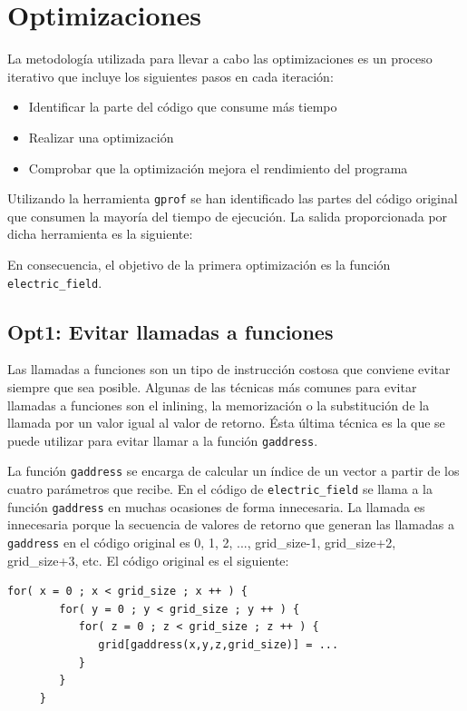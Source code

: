 \section{Optimizaciones}

La metodolog\'{i}a utilizada para llevar a cabo las optimizaciones es un
proceso iterativo que incluye los siguientes pasos en cada iteraci\'{o}n:

\begin{itemize}
\item Identificar la parte del c\'{o}digo que consume m\'{a}s tiempo
\item Realizar una optimizaci\'{o}n
\item Comprobar que la optimizaci\'{o}n mejora el rendimiento del programa
\end{itemize}

Utilizando la herramienta \texttt{gprof} se han identificado las partes del
c\'{o}digo original que consumen la mayor\'{i}a del tiempo de ejecuci\'{o}n.
La salida proporcionada por dicha herramienta es la siguiente:


En consecuencia, el objetivo de la primera optimizaci\'{o}n es la funci\'{o}n
\texttt{electric\_field}.

\subsection{Opt1: Evitar llamadas a funciones}

Las llamadas a funciones son un tipo de instrucci\'{o}n costosa que conviene
evitar siempre que sea posible. Algunas de las t\'{e}cnicas m\'{a}s comunes
para evitar llamadas a funciones son el inlining, la memorizaci\'{o}n o la
substituci\'{o}n de la llamada por un valor igual al valor de retorno.
\'{E}sta \'{u}ltima t\'{e}cnica es la que se puede utilizar para evitar llamar
a la funci\'{o}n \texttt{gaddress}.

La funci\'{o}n \texttt{gaddress} se encarga de calcular un \'{i}ndice de un
vector a partir de los cuatro par\'{a}metros que recibe. En el c\'{o}digo de
\texttt{electric\_field} se llama a la funci\'{o}n \texttt{gaddress} en
muchas ocasiones de forma innecesaria. La llamada es innecesaria porque la
secuencia de valores de retorno que generan las llamadas a \texttt{gaddress}
en el c\'{o}digo original es 0, 1, 2, ..., grid\_size-1, grid\_size+2,
grid\_size+3, etc. El c\'{o}digo original es el siguiente:

\begin{lstlisting}[]
     for( x = 0 ; x < grid_size ; x ++ ) {
        for( y = 0 ; y < grid_size ; y ++ ) {
           for( z = 0 ; z < grid_size ; z ++ ) {
              grid[gaddress(x,y,z,grid_size)] = ...
           }
        }
     }
\end{lstlisting}

